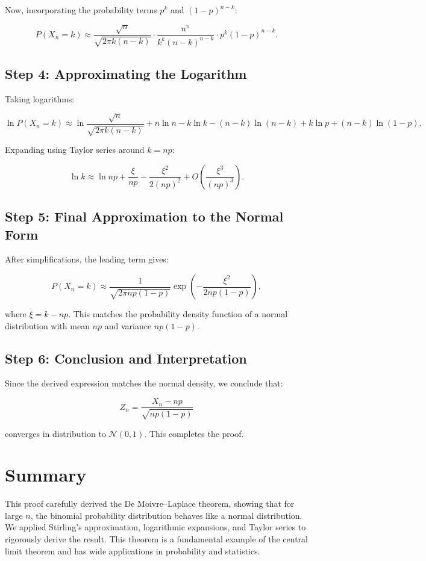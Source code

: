 \documentclass[a4paper,12pt]{article}
\begin{document}
Now, incorporating the probability terms $p^k$ and $(1-p)^{n-k}$:

\[
P(X_n = k) \approx \frac{\sqrt{n}}{\sqrt{2\pi k(n-k)}}
\cdot \frac{n^n}{k^k (n-k)^{n-k}} \cdot p^k (1 - p)^{n-k}.
\]

\subsection{Step 4: Approximating the Logarithm}

Taking logarithms:

\[
\ln P(X_n = k) \approx \ln \frac{\sqrt{n}}{\sqrt{2\pi k(n-k)}} + n\ln n - k\ln k - (n-k)\ln(n-k) + k\ln p + (n-k)\ln(1-p).
\]

Expanding using Taylor series around $k = np$:

\[
\ln k \approx \ln np + \frac{\xi}{np} - \frac{\xi^2}{2(np)^2} + O\left(\frac{\xi^3}{(np)^3}\right).
\]

\subsection{Step 5: Final Approximation to the Normal Form}

After simplifications, the leading term gives:

\[
P(X_n = k) \approx \frac{1}{\sqrt{2\pi np(1-p)}} \exp\left(-\frac{\xi^2}{2np(1-p)}\right),
\]

where $\xi = k - np$. This matches the probability density function of a normal distribution with mean $np$ and variance $np(1-p)$.

\subsection{Step 6: Conclusion and Interpretation}

Since the derived expression matches the normal density, we conclude that:

\[
Z_n = \frac{X_n - np}{\sqrt{np(1-p)}}
\]

converges in distribution to $\mathcal{N}(0,1)$. This completes the proof.

\section{Summary}

This proof carefully derived the De Moivre–Laplace theorem, showing that for large $n$, the binomial probability distribution behaves like a normal distribution. We applied Stirling’s approximation, logarithmic expansions, and Taylor series to rigorously derive the result. This theorem is a fundamental example of the central limit theorem and has wide applications in probability and statistics.
\end{document}
